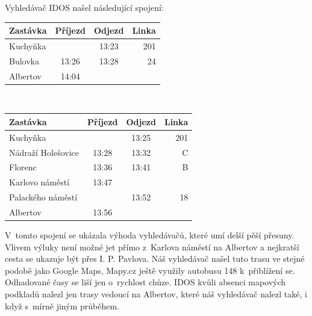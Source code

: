 Vyhledávač IDOS našel následující spojení:\\
\vspace*{-0.5cm}
\begin{center}
\begin{tabular}{|l c c r|}\hline
{\bf Zastávka}&{\bf Příjezd}&{\bf Odjezd}&{\bf Linka}\\\hline
Kuchyňka&&13:23&201\\
Bulovka&13:26&13:28&24\\
Albertov&14:04&&\\\hline
\end{tabular}\\
\end{center}
\begin{center}
\begin{tabular}{|l c c r|}\hline
{\bf Zastávka}&{\bf Příjezd}&{\bf Odjezd}&{\bf Linka}\\\hline
Kuchyňka&&13:25&201\\
Nádraží Holešovice&13:28&13:32&C\\
Florenc&13:36&13:41&B\\
Karlovo náměstí&13:47&&\\
Palackého náměstí&&13:52&18\\
Albertov&13:56&&\\\hline
\end{tabular} 
\end{center}

V~tomto spojení se ukázala výhoda vyhledávačů, které umí delší pěší přesuny.
Vlivem výluky není možné jet přímo z~Karlova náměstí na Albertov a nejkratší
cesta se ukazuje být přes I. P. Pavlova. Náš vyhledávač našel tuto trasu ve
stejné podobě jako Google Maps, Mapy.cz ještě využily autobusu 148 k~přiblížení
se. Odhadované časy se liší jen o~rychlost chůze. IDOS kvůli absenci mapových
podkladů nalezl jen trasy vedoucí na Albertov, které náš vyhledávač nalezl také,
i když s~mírně jiným průběhem. 

